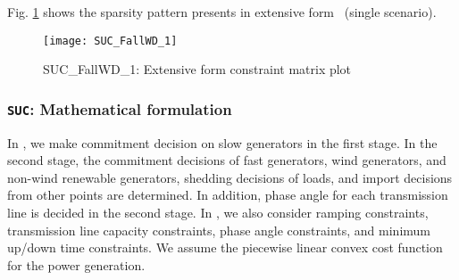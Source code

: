 Fig. \ref{fig:suc_sparsity} shows the sparsity pattern presents in extensive form \suc\ (single scenario).
\begin{figure}[H]
	\centering
	\texttt{[image: SUC\_FallWD\_1]}
	\caption{SUC\_FallWD\_1: Extensive form constraint matrix plot}
	\label{fig:suc_sparsity}
\end{figure}

\subsubsection{\texttt{SUC}: Mathematical formulation}
In \suc, we make commitment decision on slow generators in the first stage. In the second stage, the commitment decisions of fast generators, wind generators, and non-wind renewable generators, shedding decisions of loads, and import decisions from other points are determined. In addition, phase angle for each transmission line is decided in the second stage. In \suc, we also consider ramping constraints, transmission line capacity constraints, phase angle constraints, and minimum up/down time constraints. We assume the piecewise linear convex cost function for the power generation.

